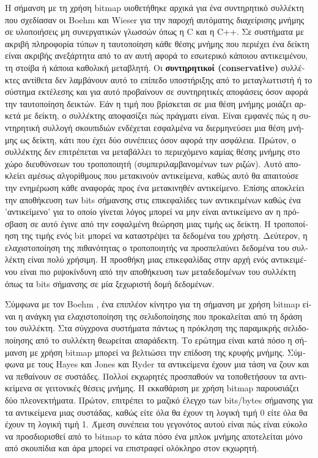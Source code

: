 \begin{greek}
Η σήμανση με τη χρήση bitmap υιοθετήθηκε αρχικά για ένα συντηρητικό
συλλέκτη που σχεδίασαν οι Boehm και Wieser \cite{DBLP:journals/spe/BoehmW88}
για την παροχή αυτόματης διαχείρισης μνήμης σε υλοποιήσεις μη 
συνεργατικών γλωσσών όπως η C και η C++. Σε συστήματα με ακριβή
πληροφορία τύπων η ταυτοποίηση κάθε θέσης μνήμης που περιέχει
ένα δείκτη είναι ακριβής ανεξάρτητα από το αν αυτή αφορά το 
εσωτερικό κάποιου αντικειμένου, τη στοίβα ή κάποια καθολική μεταβλητή.
Οι \textbf{συντηρητικοί (conservative)} συλλέκτες αντίθετα δεν
λαμβάνουν αυτό το επίπεδο υποστήριξης από το μεταγλωττιστή ή 
το σύστημα εκτέλεσης και για αυτό προβαίνουν σε συντηρητικές
αποφάσεις όσον αφορά την ταυτοποίηση δεικτών. Εάν η τιμή που
βρίσκεται σε μια θέση μνήμης μοιάζει αρκετά με δείκτη, ο συλλέκτης
αποφασίζει πώς πράγματι είναι. Είναι εμφανές πώς η συντηρητική
συλλογή σκουπιδιών ενδέχεται εσφαλμένα να διερμηνεύσει μια θέση
μνήμης ως δείκτη, κάτι που έχει δύο συνέπειες όσον αφορά την 
ασφάλεια. Πρώτον, ο συλλέκτης δεν επιτρέπεται να μεταβάλλει το
περιεχόμενο καμίας θέσης μνήμης στο χώρο διευθύνσεων του τροποποιητή
(συμπεριλαμβανομένων των ριζών). Αυτό αποκλείει αμέσως αλγορίθμους
που μετακινούν αντικείμενα, καθώς αυτό θα απαιτούσε την ενημέρωση
κάθε αναφοράς προς ένα μετακινηθέν αντικείμενο. Επίσης αποκλείει
την αποθήκευση των bits σήμανσης στις επικεφαλίδες των αντικειμένων
καθώς ένα 'αντικείμενο' για το οποίο γίνεται λόγος μπορεί να μην
είναι αντικείμενο αν η πρόσβαση σε αυτό έγινε από την εσφαλμένη
θεώρηση μιας τιμής ως δείκτη. Η τροποποίηση της τιμής ενός bit
μπορεί να καταστρέψει τα δεδομένα του χρήστη. Δεύτερον, η ελαχιστοποίηση
της πιθανότητας ο τροποποιητής να προσπελαύνει δεδομένα του
συλλέκτη είναι πολύ χρήσιμη. Η προσθήκη μιας επικεφαλίδας στην
αρχή ενός αντικειμένου είναι πιο ριψοκίνδυνη από την αποθήκευση
των μεταδεδομένων του συλλέκτη όπως τα bits  σήμανσης σε μία
ξεχωριστή δομή δεδομένων.

Σύμφωνα με τον Boehm \cite{DBLP:conf/iwmm/Boehm00}, ένα επιπλέον
κίνητρο για τη σήμανση με χρήση bitmap είναι η ανάγκη για ελαχιστοποίηση 
της σελιδοποίησης που προκαλείται από τη δράση του συλλέκτη.
Στα σύγχρονα συστήματα πάντως η πρόκληση της παραμικρής σελιδοποίησης
από το συλλέκτη θεωρείται απαράδεκτη. Το ερώτημα είναι κατά πόσο
η σήμανση με χρήση bitmap μπορεί να βελτιώσει την επίδοση της
κρυφής μνήμης. Σύμφωνα με τους Hayes \cite{DBLP:conf/oopsla/Hayes91}
και Jones και Ryder \cite{DBLP:conf/iwmm/JonesR08} τα αντικείμενα
έχουν μια τάση να ζουν και να πεθαίνουν σε συστάδες. Πολλοί εκχωρητές 
προσπαθούν να τοποθετήσουν τα αντικείμενα σε γειτονικές θέσεις
μνήμης. Η εκκαθάριση με χρήση bitmap παρουσιάζει δύο πλεονεκτήματα.
Πρώτον, επιτρέπει το μαζικό έλεγχο των bits/bytes σήμανσης για 
τα αντικείμενα μιας συστάδας, καθώς είτε όλα θα έχουν τη λογική
τιμή 0 είτε όλα θα έχουν τη λογική τιμή 1. Άμεση συνέπεια του
γεγονότος αυτού είναι πώς είναι εύκολο να προσδιορισθεί από το
bitmap το κάτα πόσο ένα μπλοκ μνήμης αποτελείται μόνο από
σκουπίδια και άρα μπορεί να επιστραφεί ολόκληρο στον εκχωρητή.


\end{greek}
